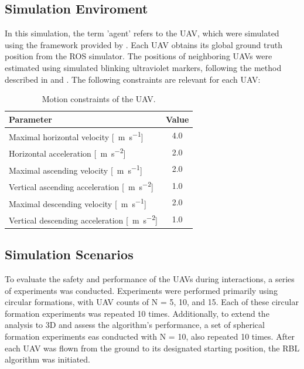     \subsection{Simulation Enviroment}
        In this simulation, the term 'agent' refers to the \ac{UAV}, which were simulated using the framework provided by \cite{mrs_uav_system}.
        Each \ac{UAV} obtains its global ground truth position from the ROS simulator.
        The positions of neighboring \ac{UAV}s were estimated using simulated blinking ultraviolet markers, following the method described in \cite{uvdd1} and \cite{uvdar_package}.
        The following constraints are relevant for each \ac{UAV}:
        \begin{table}[h]
            \centering
            \renewcommand{\arraystretch}{1.1}
            \begin{tabular}{|l|c|}
                \hline
                \textbf{Parameter} & \textbf{Value} \\ \hline
                    Maximal horizontal velocity [\SI{}{\meter\per\second}] & 4.0 \\ \hline
                    Horizontal acceleration [\SI{}{\meter\per\second\squared}] & 2.0 \\ \hline
                    Maximal ascending velocity [\SI{}{\meter\per\second}] & 2.0 \\ \hline
                    Vertical ascending acceleration [\SI{}{\meter\per\second\squared}] & 1.0 \\ \hline
                    Maximal descending velocity [\SI{}{\meter\per\second}] & 2.0 \\ \hline
                    Vertical descending acceleration [\SI{}{\meter\per\second\squared}] & 1.0 \\ \hline
                \end{tabular}
                \caption{Motion constraints of the \ac{UAV}.}
            \label{tab:uav_constraints}
        \end{table}
        
    \subsection{Simulation Scenarios}
        To evaluate the safety and performance of the \ac{UAV}s during interactions, a series of experiments was conducted. 
        Experiments were performed primarily using circular formations, with \ac{UAV} counts of N = 5, 10, and 15. 
        Each of these circular formation experiments was repeated 10 times.
        Additionally, to extend the analysis to 3D and assess the algorithm's performance, a set of spherical formation experiments eas conducted with N = 10, also repeated 10 times.
        After each \ac{UAV} was flown from the ground to its designated starting position, the \ac{RBL} algorithm was initiated.    


